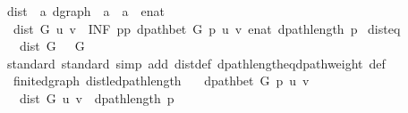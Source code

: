 \begin{isabellebody}
\isanewline
{}\isamarkupfalse%
%
\endisatagproof
{\isafoldproof}%
%
\isadelimproof
\isanewline
%
\endisadelimproof
\isanewline
{}\isamarkupfalse%
\ dist\ {\isacharcolon}{\kern0pt}{\isacharcolon}{\kern0pt}\ {\isachardoublequoteopen}{\isacharprime}{\kern0pt}a\ dgraph\ {\isasymRightarrow}\ {\isacharprime}{\kern0pt}a\ {\isasymRightarrow}\ {\isacharprime}{\kern0pt}a\ {\isasymRightarrow}\ enat{\isachardoublequoteclose}\ \isanewline
\ \ {\isachardoublequoteopen}dist\ G\ u\ v\ {\isasymequiv}\ INF\ p{\isasymin}{\isacharbraceleft}{\kern0pt}p{\isachardot}{\kern0pt}\ dpath{\isacharunderscore}{\kern0pt}bet\ G\ p\ u\ v{\isacharbraceright}{\kern0pt}{\isachardot}{\kern0pt}\ enat\ {\isacharparenleft}{\kern0pt}dpath{\isacharunderscore}{\kern0pt}length\ p{\isacharparenright}{\kern0pt}{\isachardoublequoteclose}\isanewline
\isanewline
{}\isamarkupfalse%
\ dist{\isacharunderscore}{\kern0pt}eq{\isacharunderscore}{\kern0pt}{\isasymdelta}{\isacharcolon}{\kern0pt}\isanewline
\ \ \ {\isachardoublequoteopen}dist\ G\ {\isacharequal}{\kern0pt}\ {\isasymdelta}\ G\ {\isacharparenleft}{\kern0pt}{\isasymlambda}{\isacharunderscore}{\kern0pt}{\isachardot}{\kern0pt}\ {}{\isacharparenright}{\kern0pt}{\isachardoublequoteclose}\isanewline
%
\isadelimproof
\ \ %
\endisadelimproof
%
\isatagproof
{}\isamarkupfalse%
\ {\isacharparenleft}{\kern0pt}standard{\isacharcomma}{\kern0pt}\ standard{\isacharparenright}{\kern0pt}\ {\isacharparenleft}{\kern0pt}simp\ add{\isacharcolon}{\kern0pt}\ dist{\isacharunderscore}{\kern0pt}def\ dpath{\isacharunderscore}{\kern0pt}length{\isacharunderscore}{\kern0pt}eq{\isacharunderscore}{\kern0pt}dpath{\isacharunderscore}{\kern0pt}weight\ {\isasymdelta}{\isacharunderscore}{\kern0pt}def{\isacharparenright}{\kern0pt}%
\endisatagproof
{\isafoldproof}%
%
\isadelimproof
\isanewline
%
\endisadelimproof
\isanewline
{}\isamarkupfalse%
\ {\isacharparenleft}{\kern0pt}\ finite{\isacharunderscore}{\kern0pt}dgraph{\isacharparenright}{\kern0pt}\ dist{\isacharunderscore}{\kern0pt}le{\isacharunderscore}{\kern0pt}dpath{\isacharunderscore}{\kern0pt}length{\isacharcolon}{\kern0pt}\isanewline
\ \ \ {\isachardoublequoteopen}dpath{\isacharunderscore}{\kern0pt}bet\ G\ p\ u\ v{\isachardoublequoteclose}\isanewline
\ \ \ {\isachardoublequoteopen}dist\ G\ u\ v\ {\isasymle}\ dpath{\isacharunderscore}{\kern0pt}length\ p{\isachardoublequoteclose}\isanewline
%
\isadelimproof
\ \ %
\endisadelimproof
%
\isatagproof
{}\isamarkupfalse%

\end{isabellebody}
